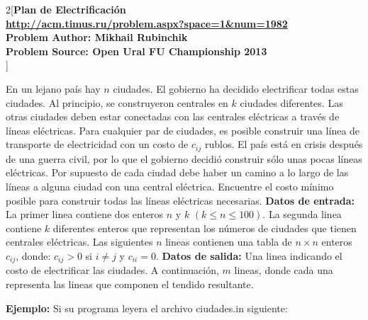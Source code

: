 \begin{multicols}{2}[\center\textbf{\large{Plan de Electrificación\\\small{\url{http://acm.timus.ru/problem.aspx?space=1&num=1982}\\Problem Author: Mikhail Rubinchik\\ 
Problem Source: Open Ural FU Championship 2013\\}}}]

\author{}

\justify
En un lejano país hay $n$ ciudades. El gobierno ha decidido electrificar todas estas ciudades. Al principio, se construyeron centrales en $k$ ciudades diferentes. Las otras ciudades deben estar conectadas con las centrales eléctricas a través de líneas eléctricas. Para cualquier par de ciudades, es posible construir una línea de transporte de electricidad con un costo de $c_{ij}$ rublos. El país está en crisis después de una guerra civil, por lo que el gobierno decidió construir sólo unas pocas líneas eléctricas. Por supuesto de cada ciudad debe haber un camino a lo largo de las líneas a alguna ciudad con una central eléctrica. Encuentre el costo mínimo posible para construir todas las líneas eléctricas necesarias.
\justify
\textbf{Datos de entrada:}
La primer linea contiene dos enteros $n$ y $k$ $(k \leq n \leq 100)$.
La segunda linea contiene $k$ diferentes enteros que representan los números de ciudades que tienen centrales eléctricas. 
Las siguientes $n$ lineas contienen una tabla de $n \times n$ enteros $c_{ij}$, donde: $c_{ij} >0$ si $i \not = j$ y $c_{ii} = 0$.
\justify
\textbf{Datos de salida:}
Una linea indicando el costo de electrificar las ciudades.
A continuación, $m$ lineas, donde cada una representa las lineas que componen el tendido resultante. 

\justify
\textbf{Ejemplo:} 
Si su programa leyera el archivo ciudades.in siguiente:\\

\noindent
{}


\end{multicols}

